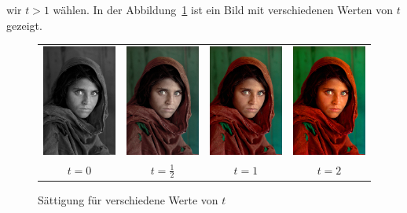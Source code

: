 wir $t>1$ wählen.
In der Abbildung~\ref{color:saettigung}
ist ein Bild mit verschiedenen Werten von $t$ gezeigt.
\begin{figure}
\begin{center}
\begin{tabular}{cccc}
\includegraphics[width=0.22\hsize]{graphics/saettigung0.jpg}&%
\includegraphics[width=0.22\hsize]{graphics/saettigunghalb.jpg}&%
\includegraphics[width=0.22\hsize]{graphics/saettigung1.jpg}&%
\includegraphics[width=0.22\hsize]{graphics/saettigung2.jpg}\\
$t=0$&$t=\frac12$&$t=1$&$t=2$
\end{tabular}
\end{center}
\caption{Sättigung für verschiedene Werte von $t$
\label{color:saettigung}}
\end{figure}


